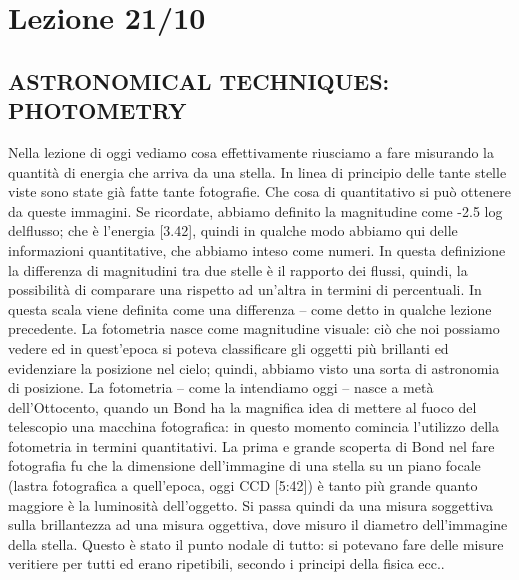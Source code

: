 \documentclass[a4paper,11pt]{article}
\begin{document}
\newpage
\section{Lezione 21/10}
\subsection{ASTRONOMICAL TECHNIQUES: PHOTOMETRY}
Nella lezione di oggi vediamo cosa effettivamente riusciamo a fare misurando la quantità di energia che arriva da una stella. In linea di principio delle tante stelle viste sono state già fatte tante fotografie. Che cosa di quantitativo si può ottenere da queste immagini. Se ricordate, abbiamo definito la magnitudine come -2.5 log delflusso; che è l’energia [3.42], quindi in qualche modo abbiamo qui delle informazioni quantitative, che abbiamo inteso come numeri. In questa definizione la differenza di magnitudini tra due stelle è il rapporto dei flussi, quindi, la possibilità di comparare una rispetto ad un'altra in termini di percentuali. In questa scala viene definita come una differenza – come detto in qualche lezione precedente.
\newline
La fotometria nasce come magnitudine visuale: ciò che noi possiamo vedere ed in quest’epoca si poteva classificare gli oggetti più brillanti ed evidenziare la posizione nel cielo; quindi, abbiamo visto una sorta di astronomia di posizione. La fotometria – come la intendiamo oggi – nasce a metà dell’Ottocento, quando un Bond ha la magnifica idea di mettere al fuoco del telescopio una macchina fotografica: in questo momento comincia l’utilizzo della fotometria in termini quantitativi. La prima e grande scoperta di Bond nel fare fotografia fu che la dimensione dell’immagine di una stella su un piano focale (lastra fotografica a quell’epoca, oggi CCD [5:42]) è tanto più grande quanto maggiore è la luminosità dell’oggetto. Si passa quindi da una misura soggettiva sulla brillantezza ad una misura oggettiva, dove misuro il diametro dell’immagine della stella. Questo è stato il punto nodale di tutto: si potevano fare delle misure veritiere per tutti ed erano ripetibili, secondo i principi della fisica ecc..
\newline
\end{document}
